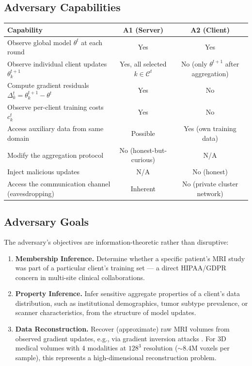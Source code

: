 \documentclass{article}
\begin{document}
\subsection{Adversary Capabilities}

\begin{table}[h]
\centering
\begin{tabular}{lcc}
\toprule
\textbf{Capability} & \textbf{A1 (Server)} & \textbf{A2 (Client)} \\
\midrule
Observe global model $\theta^t$ at each round & Yes & Yes \\
Observe individual client updates $\theta_k^{t+1}$ & Yes, all selected $k \in \mathcal{C}^t$ & No (only $\theta^{t+1}$ after aggregation) \\
Compute gradient residuals $\Delta_k^t = \theta_k^{t+1} - \theta^t$ & Yes & No \\
Observe per-client training costs $c_k^t$ & Yes & No \\
Access auxiliary data from same domain & Possible & Yes (own training data) \\
Modify the aggregation protocol & No (honest-but-curious) & N/A \\
Inject malicious updates & N/A & No (honest) \\
Access the communication channel (eavesdropping) & Inherent & No (private cluster network) \\
\bottomrule
\end{tabular}
\end{table}

\subsection{Adversary Goals}

The adversary's objectives are information-theoretic rather than disruptive:

\begin{enumerate}
    \item \textbf{Membership Inference.} Determine whether a specific patient's MRI study was part of a particular client's training set --- a direct HIPAA/GDPR concern in multi-site clinical collaborations.

    \item \textbf{Property Inference.} Infer sensitive aggregate properties of a client's data distribution, such as institutional demographics, tumor subtype prevalence, or scanner characteristics, from the structure of model updates.

    \item \textbf{Data Reconstruction.} Recover (approximate) raw MRI volumes from observed gradient updates, e.g., via gradient inversion attacks \cite{zhu_deep_2019}. For 3D medical volumes with 4 modalities at $128^3$ resolution ($\sim$8.4M voxels per sample), this represents a high-dimensional reconstruction problem.
\end{enumerate}
\end{document}
